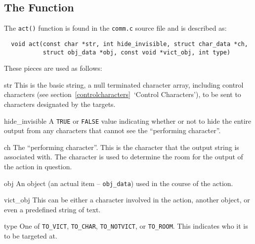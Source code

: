 \documentclass[11pt]{article}
\newenvironment{Ventry}[1]
  {\begin{list}{}{\renewcommand{\makelabel}[1]{\textsf{##1:}\hfil}
    \settowidth{\labelwidth}{\textsf{#1:}}
    \setlength{\leftmargin}{\labelwidth}
    \addtolength{\leftmargin}{\labelsep}
  }
  }
  {\end{list}}
\begin{document}
\subsection{The Function}\label{function}
The \texttt{act()} function is found in the \texttt{comm.c} source file and is described as:
\begin{verbatim}
  void act(const char *str, int hide_invisible, struct char_data *ch,
           struct obj_data *obj, const void *vict_obj, int type)
\end{verbatim}
These pieces are used as follows:
\begin{Ventry}{hide\_invisible}
\item[str] This is the basic string, a null terminated character array, including control characters (see section~\vref{controlcharacters}~`Control Characters'), to be sent to characters designated by the targets.
\item[hide\_invisible] A \texttt{TRUE} or \texttt{FALSE} value indicating whether or not to hide the entire output from any characters that cannot see the ``performing character''.
\item[ch] The ``performing character''.  This is the character that the output string is associated with.  The character is used to determine the room for the output of the action in question.
\item[obj] An object (an actual item -- \texttt{obj\_data}) used in the course of the action.
\item[vict\_obj] This can be either a character involved in the action, another object, or even a predefined string of text.
\item[type] One of \texttt{TO\_VICT}, \texttt{TO\_CHAR}, \texttt{TO\_NOTVICT}, or \texttt{TO\_ROOM}. This indicates who it is to be targeted at.
\end{Ventry}
\end{document}
